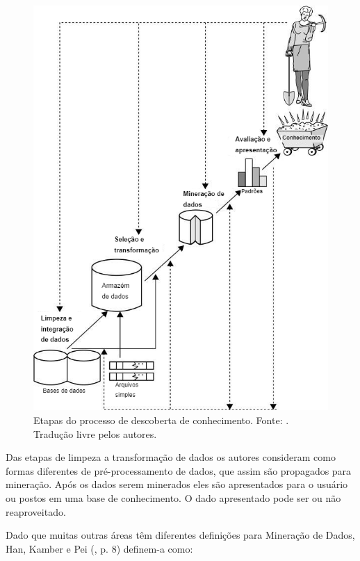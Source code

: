 \begin{figure}[H]
    \centering
    \includegraphics[scale=0.45]{figuras/referencial_teorico/etapas_ml.png}
    \caption[Etapas do processo de descoberta de conhecimento]{Etapas do processo de descoberta de conhecimento. Fonte: \cite{Han:2011:DMC:1972541}. Tradução livre pelos autores.}
    \label{fig:etapas_ml}
\end{figure}

Das etapas de limpeza a transformação de dados os autores consideram como formas diferentes de pré-processamento de dados, que assim são propagados para mineração. Após os dados serem minerados eles são apresentados para o usuário ou postos em uma base de conhecimento. O dado apresentado pode ser ou não reaproveitado.

Dado que muitas outras áreas têm diferentes definições para Mineração de Dados, Han, Kamber e Pei (\citeyear{Han:2011:DMC:1972541}, p. 8) definem-a como:

